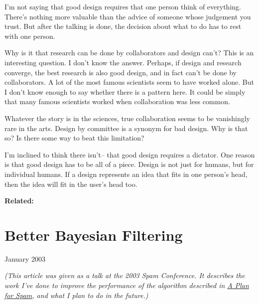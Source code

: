 \documentclass[12pt]{book}
\begin{document}
I'm not saying that good design requires that one person think of
everything. There's nothing more valuable than the advice of someone
whose judgement you trust. But after the talking is done, the decision
about what to do has to rest with one person.

Why is it that research can be done by collaborators and design can't?
This is an interesting question. I don't know the answer. Perhaps, if
design and research converge, the best research is also good design, and
in fact can't be done by collaborators. A lot of the most famous
scientists seem to have worked alone. But I don't know enough to say
whether there is a pattern here. It could be simply that many famous
scientists worked when collaboration was less common.

Whatever the story is in the sciences, true collaboration seems to be
vanishingly rare in the arts. Design by committee is a synonym for bad
design. Why is that so? Is there some way to beat this limitation?

I'm inclined to think there isn't-- that good design requires a
dictator. One reason is that good design has to be all of a piece.
Design is not just for humans, but for individual humans. If a design
represents an idea that fits in one person's head, then the idea will
fit in the user's head too.

\textbf{Related:}
\chapter{Better Bayesian Filtering}

January 2003

\emph{(This article was given as a talk at the 2003 Spam Conference. It
describes the work I've done to improve the performance of the algorithm
described in \href{spam.html}{A Plan for Spam}, and what I plan to do in
the future.)}
\end{document}

